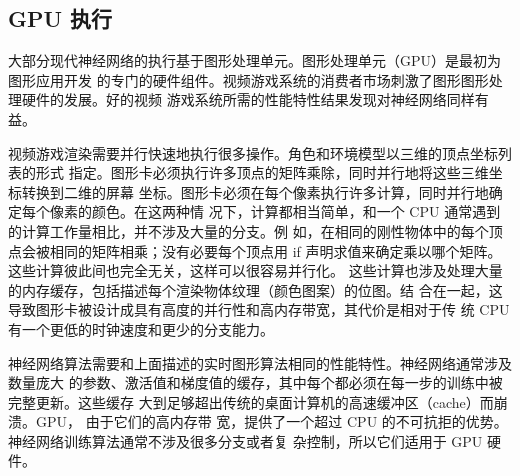 \subsection{GPU 执行}
\label{subsec:gpu_implementations}

大部分现代神经网络的执行基于图形处理单元。图形处理单元（GPU）是最初为图形应用开发
的专门的硬件组件。视频游戏系统的消费者市场刺激了图形图形处理硬件的发展。好的视频
游戏系统所需的性能特性结果发现对神经网络同样有益。

视频游戏渲染需要并行快速地执行很多操作。角色和环境模型以三维的顶点坐标列表的形式
指定。图形卡必须执行许多顶点的矩阵乘除，同时并行地将这些三维坐标转换到二维的屏幕
坐标。图形卡必须在每个像素执行许多计算，同时并行地确定每个像素的颜色。在这两种情
况下，计算都相当简单，和一个 CPU 通常遇到的计算工作量相比，并不涉及大量的分支。例
如，在相同的刚性物体中的每个顶点会被相同的矩阵相乘；没有必要每个顶点用 {\serif
  if} 声明求值来确定乘以哪个矩阵。这些计算彼此间也完全无关，这样可以很容易并行化。
这些计算也涉及处理大量的内存缓存，包括描述每个渲染物体纹理（颜色图案）的位图。结
合在一起，这导致图形卡被设计成具有高度的并行性和高内存带宽，其代价是相对于传
统 CPU 有一个更低的时钟速度和更少的分支能力。

神经网络算法需要和上面描述的实时图形算法相同的性能特性。神经网络通常涉及数量庞大
的参数、激活值和梯度值的缓存，其中每个都必须在每一步的训练中被完整更新。这些缓存
大到足够超出传统的桌面计算机的高速缓冲区（cache）而崩溃。GPU， 由于它们的高内存带
宽，提供了一个超过 CPU 的不可抗拒的优势。神经网络训练算法通常不涉及很多分支或者复
杂控制，所以它们适用于 GPU 硬件。

